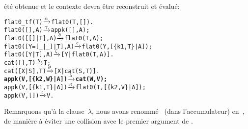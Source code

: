 été obtenue et le contexte devra être reconstruit et évalué:
\begin{alltt}
flat0\_tf(T)          \(\smashedrightarrow{\alpha}\) flat0(T,[]).
flat0(         [],A) \(\smashedrightarrow{\gamma}\) appk([],A);
flat0(     [[]|T],A) \(\smashedrightarrow{\delta}\) flat0(T,A);
flat0([Y=[\_|\_]|T],A) \(\smashedrightarrow{\epsilon}\) flat0(Y,[\{k1,T\}|A]);
flat0(      [Y|T],A) \(\smashedrightarrow{\zeta}\) [Y|flat0(T,A)].
cat(   [],T)         \(\smashedrightarrow{\eta}\) T;
cat([X|S],T)         \(\smashedrightarrow{\theta}\) [X|cat(S,T)].
\textbf{appk(V,[\{k2,W\}|A])   \(\smashedrightarrow{\lambda}\) cat(W,V);}\hfill% A \emph{inutile pour le moment}
appk(V,[\{k1,T\}|A])   \(\smashedrightarrow{\kappa}\) flat0(T,[\{k2,V\}|A]);
appk(V,        [])   \(\smashedrightarrow{\iota}\) V.
\end{alltt}
Remarquons qu'à la clause~\(\lambda\), nous avons renommé~
(dans l'accumulateur) en~, de manière à éviter une
collision avec le premier argument de .

